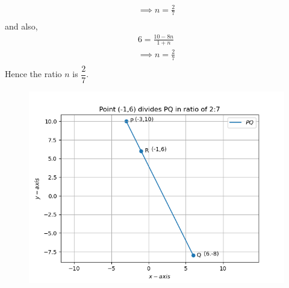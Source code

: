 \documentclass[12pt]{article}
\begin{document}
\begin{enumerate}
\begin{multline}
         \implies n=\frac{2}{7}\\
\end{multline}
and also,
\begin{multline}
         6=\frac{10-8n}{1+n}\\
          \implies n=\frac{2}{7}\\
\end{multline}
Hence the ratio $n$ is $\dfrac{2}{7}$.
\begin{figure}[!h]
 \begin{center}
  \includegraphics[width=\columnwidth]{figs/Figure_1.png}
 \end{center}
\caption{}
\label{fig:Fig1}
\end{figure}
\end{enumerate}
\end{document}
